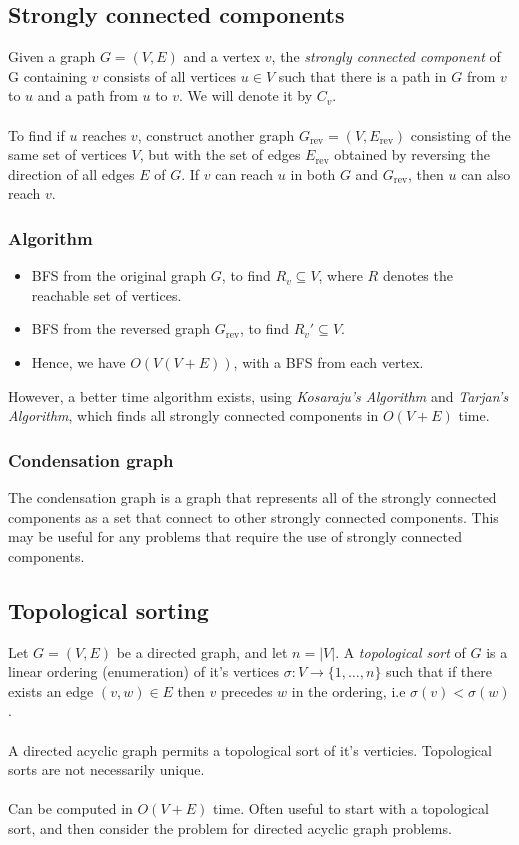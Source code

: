 \documentclass[journal, letterpaper]{IEEEtran}
\begin{document}
  \subsection{Strongly connected components}
  Given a graph $G = (V, E)$ and a vertex $v$, the \emph{strongly connected component} of G containing $v$ consists
  of all vertices $u \in V$ such that there is a path in $G$ from $v$ to $u$ and a path from $u$ to $v$. We will
  denote it by $C_v$. \\ \\ 
  To find if $u$ reaches $v$, construct another graph $G_{\text{rev}} = (V, E_{\text{rev}})$ consisting of the same
  set of vertices $V$, but with the set of edges $E_{\text{rev}}$ obtained by reversing the direction of all edges
  $E$ of $G$. If $v$ can reach $u$ in both $G$ and $G_{\text{rev}}$, then $u$ can also reach $v$.
  \subsubsection{Algorithm}
  \begin{itemize}
    \item BFS from the original graph $G$, to find $R_v \subseteq V$, where $R$ denotes the reachable set of vertices.
    \item BFS from the reversed graph $G_{\text{rev}}$, to find $R_v' \subseteq V$.
    \item Hence, we have $O(V(V + E))$, with a BFS from each vertex.
  \end{itemize}
  However, a better time algorithm exists, using \emph{Kosaraju's Algorithm} and \emph{Tarjan's Algorithm}, which finds all strongly connected components
  in $O(V + E)$ time.
  \subsubsection{Condensation graph}
  The condensation graph is a graph that represents all of the strongly connected components as a set that connect to other
  strongly connected components. This may be useful for any problems that require the use of strongly connected components.
  \subsection{Topological sorting}
  Let $G = (V, E)$ be a directed graph, and let $n = |V|$. A \emph{topological sort} of $G$ is a linear ordering (enumeration) of
  it's vertices $\sigma : V \to \{1, \ldots, n \}$ such that if there exists an edge $(v, w) \in E$ then $v$ precedes $w$ in
  the ordering, i.e $\sigma(v) < \sigma(w)$. \\ \\ 
  A directed acyclic graph permits a topological sort of it's verticies. Topological sorts are not necessarily unique. \\ \\ 
  Can be computed in $O(V + E)$ time. Often useful to start with a topological sort, and then consider the problem for
  directed acyclic graph problems.
\end{document}
